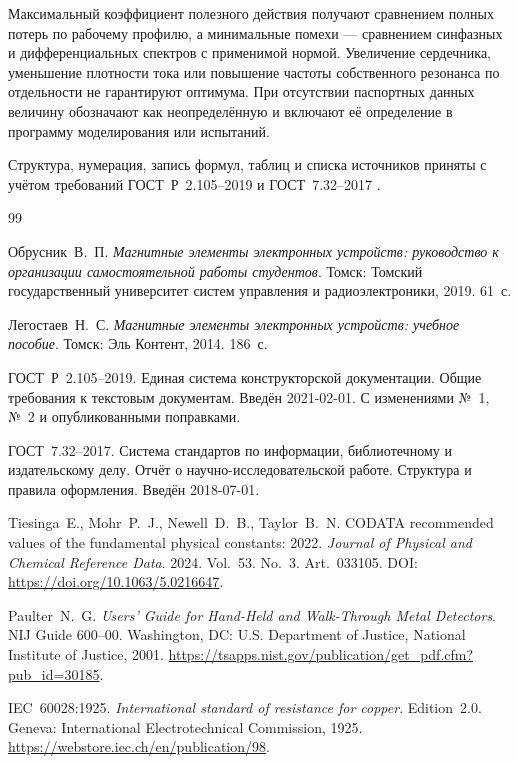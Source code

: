 \documentclass[14pt,a4paper]{extarticle}
\begin{document}
Максимальный коэффициент полезного действия получают сравнением полных
потерь по рабочему профилю, а минимальные помехи --- сравнением синфазных и
дифференциальных спектров с применимой нормой. Увеличение сердечника,
уменьшение плотности тока или повышение частоты собственного резонанса по
отдельности не гарантируют оптимума. При отсутствии паспортных данных
величину обозначают как неопределённую и включают её определение в программу
моделирования или испытаний.

Структура, нумерация, запись формул, таблиц и списка источников приняты с
учётом требований ГОСТ~Р~2.105--2019 и ГОСТ~7.32--2017
\cite{gost2105,gost732}.

\begin{thebibliography}{99}

Обрусник~В.~П.
\textit{Магнитные элементы электронных устройств: руководство к
организации самостоятельной работы студентов}.
Томск: Томский государственный университет систем управления и
радиоэлектроники, 2019. 61~с.

Легостаев~Н.~С.
\textit{Магнитные элементы электронных устройств: учебное пособие}.
Томск: Эль Контент, 2014. 186~с.

ГОСТ~Р~2.105--2019. Единая система конструкторской документации.
Общие требования к текстовым документам. Введён 2021-02-01.
С изменениями №~1, №~2 и опубликованными поправками.

ГОСТ~7.32--2017. Система стандартов по информации, библиотечному и
издательскому делу. Отчёт о научно-исследовательской работе. Структура и
правила оформления. Введён 2018-07-01.

Tiesinga~E., Mohr~P.~J., Newell~D.~B., Taylor~B.~N.
CODATA recommended values of the fundamental physical constants: 2022.
\textit{Journal of Physical and Chemical Reference Data}. 2024. Vol.~53.
No.~3. Art.~033105.
DOI: \url{https://doi.org/10.1063/5.0216647}.

Paulter~N.~G.
\textit{Users' Guide for Hand-Held and Walk-Through Metal Detectors}.
NIJ Guide 600--00. Washington, DC: U.S. Department of Justice,
National Institute of Justice, 2001.
\url{https://tsapps.nist.gov/publication/get_pdf.cfm?pub_id=30185}.

IEC~60028:1925.
\textit{International standard of resistance for copper}. Edition~2.0.
Geneva: International Electrotechnical Commission, 1925.
\url{https://webstore.iec.ch/en/publication/98}.


\end{thebibliography}
\end{document}
